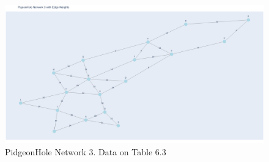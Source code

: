 \documentclass[11pt]{book}
\renewcommand{\=}[1]{\stackrel{#1}{=}} %
\theoremstyle{definition}
\theoremstyle{remark}
\begin{document}
\begin{figure}
    \centering
    \includegraphics[width=1\linewidth]{img/PigeonHole NW3.png}
    \caption{PidgeonHole Network 3. Data on Table 6.3}
    \label{fig:enter-label}
\end{figure}
\end{document}
